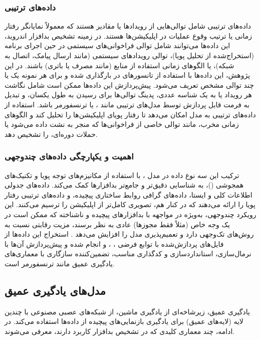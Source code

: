 \subsubsection{داده‌های ترتیبی}
داده‌های ترتیبی شامل توالی‌هایی از رویدادها یا مقادیر هستند که معمولاً نمایانگر رفتار زمانی یا ترتیب وقوع عملیات در اپلیکیشن‌ها هستند. در زمینه تشخیص بدافزار اندروید، این داده‌ها می‌توانند شامل توالی فراخوانی‌های  سیستمی در حین اجرای برنامه (استخراج‌شده از تحلیل پویا)، توالی رویدادهای سیستمی (مانند ارسال پیامک، اتصال به شبکه)، یا الگوهای زمانی استفاده از منابع (مانند مصرف  یا باتری) باشند. در این پژوهش، این داده‌ها با استفاده از تانسورهای  در  بارگذاری شده و برای هر نمونه یک یا چند توالی مشخص تعریف می‌شود. پیش‌پردازش این داده‌ها ممکن است شامل نگاشت هر رویداد یا  به یک شناسه عددی، پدینگ  توالی‌ها برای رسیدن به طول یکسان، و تبدیل به فرمت قابل پردازش توسط مدل‌های ترتیبی مانند ،  یا ترنسفورمر باشد. استفاده از داده‌های ترتیبی به مدل امکان می‌دهد تا رفتار پویای اپلیکیشن‌ها را تحلیل کند و الگوهای زمانی مخرب، مانند توالی خاصی از فراخوانی‌ها که منجر به نشت داده می‌شود یا حملات دوره‌ای، را تشخیص دهد.

\subsubsection{اهمیت و یکپارچگی داده‌های چندوجهی}
ترکیب این سه نوع داده در مدل ، با استفاده از مکانیزم‌های توجه پویا و تکنیک‌های همجوشی ()، به شناسایی دقیق‌تر و جامع‌تر بدافزارها کمک می‌کند. داده‌های جدولی اطلاعات کلی و ایستا، داده‌های گرافی روابط ساختاری پیچیده، و داده‌های ترتیبی رفتار پویا را ارائه می‌دهند که در کنار هم، تصویری کامل‌تر از اپلیکیشن را ترسیم می‌کنند. این رویکرد چندوجهی، به‌ویژه در مواجهه با بدافزارهای پیچیده و ناشناخته که ممکن است در یک وجه خاص (مثلاً فقط مجوزها) عادی به نظر برسند، مزیت رقابتی نسبت به روش‌های تک‌وجهی دارد و تعمیم‌پذیری مدل را افزایش می‌دهد \cite{Marastoni2022}. استخراج این داده‌ها از فایل‌های پردازش‌شده با توابع فرضی ، ، و  انجام شده و پیش‌پردازش آن‌ها با نرمال‌سازی، استانداردسازی و کدگذاری مناسب، تضمین‌کننده سازگاری با معماری‌های یادگیری عمیق مانند ترنسفورمر است.

\subsection{مدل‌های یادگیری عمیق}
یادگیری عمیق، زیرشاخه‌ای از یادگیری ماشین، از شبکه‌های عصبی مصنوعی با چندین لایه (لایه‌های عمیق) برای یادگیری بازنمایی‌های پیچیده از داده‌ها استفاده می‌کند. در ادامه، چند معماری کلیدی که در تشخیص بدافزار کاربرد دارند، معرفی می‌شوند.

